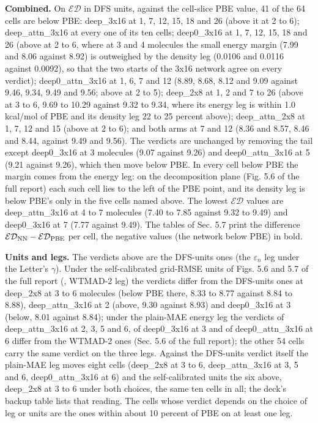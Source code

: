 \documentclass[10pt,a4paper]{article}
\begin{document}
\textbf{Combined.} On $\mathcal{ED}$ in DFS units, against the cell-slice PBE value, 41 of the 64 cells are below PBE: deep\_3x16 at 1, 7, 12, 15, 18 and 26 (above it at 2 to 6); deep\_attn\_3x16 at every one of its ten cells; deep0\_3x16 at 1, 7, 12, 15, 18 and 26 (above at 2 to 6, where at 3 and 4 molecules the small energy margin (7.99 and 8.06 against 8.92) is outweighed by the density leg (0.0106 and 0.0116 against 0.0092), so that the two starts of the 3x16 network agree on every verdict); deep0\_attn\_3x16 at 1, 6, 7 and 12 (8.89, 8.68, 8.12 and 9.09 against 9.46, 9.34, 9.49 and 9.56; above at 2 to 5); deep\_2x8 at 1, 2 and 7 to 26 (above at 3 to 6, 9.69 to 10.29 against 9.32 to 9.34, where its energy leg is within 1.0 kcal/mol of PBE and its density leg 22 to 25 percent above); deep\_attn\_2x8 at 1, 7, 12 and 15 (above at 2 to 6); and both arms at 7 and 12 (8.36 and 8.57, 8.46 and 8.44, against 9.49 and 9.56). The verdicts are unchanged by removing the tail except deep0\_3x16 at 3 molecules (9.07 against 9.26) and deep0\_attn\_3x16 at 5 (9.21 against 9.26), which then move below PBE. In every cell below PBE the margin comes from the energy leg: on the decomposition plane (Fig. 5.6 of the full report) each such cell lies to the left of the PBE point, and its density leg is below PBE's only in the five cells named above. The lowest $\mathcal{ED}$ values are deep\_attn\_3x16 at 4 to 7 molecules (7.40 to 7.85 against 9.32 to 9.49) and deep0\_3x16 at 7 (7.77 against 9.49). The tables of Sec. 5.7 print the difference $\mathcal{ED}_{\rm NN} - \mathcal{ED}_{\rm PBE}$ per cell, the negative values (the network below PBE) in bold.

\textbf{Units and legs.} The verdicts above are the DFS-units ones (the $\varepsilon_n$ leg under the Letter's $\gamma$). Under the self-calibrated grid-RMSE units of Figs. 5.6 and 5.7 of the full report (, WTMAD-2 leg) the verdicts differ from the DFS-units ones at deep\_2x8 at 3 to 6 molecules (below PBE there, 8.33 to 8.77 against 8.84 to 8.88), deep\_attn\_3x16 at 2 (above, 9.30 against 8.93) and deep0\_3x16 at 3 (below, 8.01 against 8.84); under the plain-MAE energy leg the verdicts of deep\_attn\_3x16 at 2, 3, 5 and 6, of deep0\_3x16 at 3 and of deep0\_attn\_3x16 at 6 differ from the WTMAD-2 ones (Sec. 5.6 of the full report); the other 54 cells carry the same verdict on the three legs. Against the DFS-units verdict itself the plain-MAE leg moves eight cells (deep\_2x8 at 3 to 6, deep\_attn\_3x16 at 3, 5 and 6, deep0\_attn\_3x16 at 6) and the self-calibrated units the six above, deep\_2x8 at 3 to 6 under both choices, the same ten cells in all; the deck's backup table lists that reading. The cells whose verdict depends on the choice of leg or units are the ones within about 10 percent of PBE on at least one leg.
\end{document}
